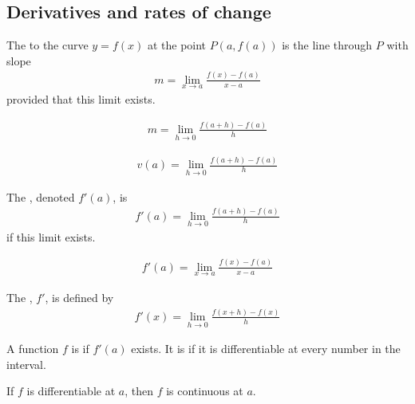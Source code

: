 \documentclass{article}
\begin{document}
\subsection{Derivatives and rates of change}
\begin{definition}
    The  to the curve $y=f(x)$ at the point $P(a, f(a))$ is the line through $P$ with slope
    \begin{align*}
        m=\lim_{x\to a}\frac{f(x)-f(a)}{x-a}
    \end{align*}
    provided that this limit exists.
\end{definition}
\begin{theorem}
    \begin{align*}
        m=\lim_{h\to 0}\frac{f(a + h)-f(a)}{h}
    \end{align*}
\end{theorem}
\begin{theorem}
    \begin{align*}
        v(a)=\lim_{h\to 0}\frac{f(a+h)-f(a)}{h}
    \end{align*}
\end{theorem}
\begin{definition}
    The , denoted $f'(a)$, is
    \begin{align*}
        f'(a)=\lim_{h\to 0}\frac{f(a+h)-f(a)}{h}
    \end{align*}
    if this limit exists.
\end{definition}
\begin{theorem}
    \begin{align*}
        f'(a)=\lim_{x\to a}\frac{f(x)-f(a)}{x-a}
    \end{align*}
\end{theorem}
\begin{definition}
    The , $f'$, is defined by
    \begin{align*}
        f'(x)=\lim_{h\to 0}\frac{f(x+h)-f(x)}{h}
    \end{align*}
\end{definition}
\begin{definition}
    A function $f$ is  if $f'(a)$ exists. It is  if it is differentiable at every number in the interval.
\end{definition}
\begin{theorem}
    If $f$ is differentiable at $a$, then $f$ is continuous at $a$.
\end{theorem}
\end{document}
